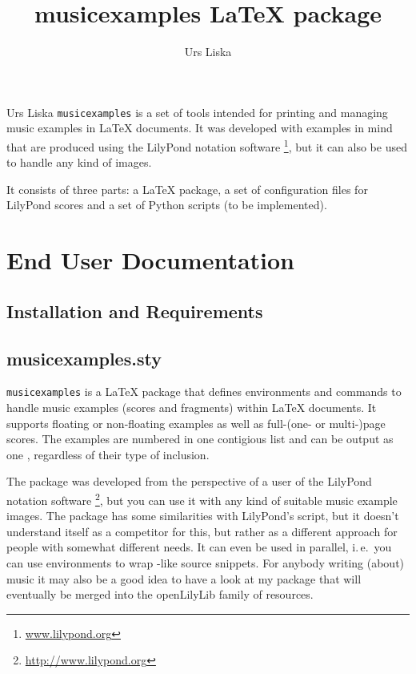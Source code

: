\documentclass{OLLbook}
\title{musicexamples \LaTeX{} package}
\author{Urs Liska}
\begin{document}
\maketitle
\begin{authorAbstract}{Urs Liska}
\texttt{musicexamples} is a set of tools intended for printing and managing music examples in \LaTeX{} documents.
It was developed with examples in mind that are produced using the LilyPond notation software%
\footnote{\url{www.lilypond.org}},
but it can also be used to handle any kind of images.

It consists of three parts: a \LaTeX{} package, a set of configuration files for LilyPond scores and a set of Python scripts (to be implemented).
\end{authorAbstract}

\vfill


\tableofcontents

\chapter{End User Documentation}
\section{Installation and Requirements}

\section{musicexamples.sty}
\label{sec:xmp_musicexamples}

\texttt{musicexamples} is a \LaTeX{} package that defines environments and commands to handle music examples (scores and fragments) within \LaTeX{} documents.
It supports floating or non-floating examples as well as full-(one- or multi-)page scores.
The examples are numbered in one contigious list and can be output as one , regardless of their type of inclusion.

The package was developed from the perspective of a user of the LilyPond notation software%
\footnote{\url{http://www.lilypond.org}}, but you can use it with any kind of suitable music example images.
The package has some similarities with LilyPond's  script, but it doesn't understand itself as a competitor for this, but rather as a different approach for people with somewhat different needs.
It can even be used in parallel, i.\,e.\ you can use  environments to wrap -like source snippets.
For anybody writing (about) music it may also be a good idea to have a look at my  package that will eventually be merged into the openLilyLib family of resources.
\end{document}
